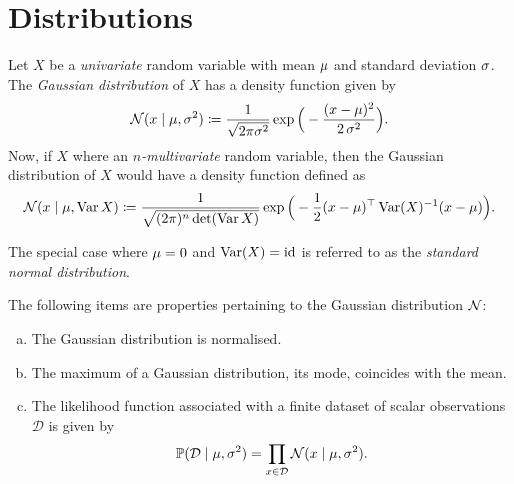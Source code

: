 \section{Distributions}

\begin{definition}
    \label{def:gaussian-distribution}
    Let \(X\) be a \emph{univariate} random variable with mean \(\mu\) and
    standard deviation \(\operatorname{\sigma}\). The \emph{Gaussian distribution} of \(X\) has a
    density function given by
    \[
        \operatorname{\mathcal{N}}(x \mid \mu, \operatorname{\sigma}^2) \coloneq \frac{1}{\sqrt{2 \pi \sigma^{2}}}
        \exp\Big( -\frac{(x - \mu)^2}{2 \operatorname{\sigma}^2} \Big).
    \]
    Now, if \(X\) where an \emph{\(n\)-multivariate} random variable, then the Gaussian
    distribution of \(X\) would have a density function defined as
    \[
        \operatorname{\mathcal{N}}(x \mid \mu, \operatorname{Var} X) \coloneq \frac{1}{\sqrt{(2 \pi)^n \det(\operatorname{Var} X)}}
        \exp\Big(-\frac{1}{2} (x - \mu)^{\operatorname{\top}} \operatorname{Var}(X)^{-1} (x - \mu)\Big).
    \]

    The special case where \(\mu = 0\) and \(\operatorname{Var}(X) = \operatorname{id}\) is referred to as the
    \emph{standard normal distribution}.
\end{definition}

\begin{proposition}
    \label{prop:gaussian-distribution-basic-properties}
    The following items are properties pertaining to the Gaussian distribution
    \(\operatorname{\mathcal{N}}\):
    \begin{enumerate}[(a)]\setlength\itemsep{0em}
        \item The Gaussian distribution is normalised.

        \item The maximum of a Gaussian distribution, its mode, coincides with the mean.

        \item The likelihood function associated with a finite dataset of scalar
              observations \(\mathcal{D}\) is given by
              \[
                  \operatorname{\mathbb{P}}(\mathcal{D} \mid \mu, \operatorname{\sigma}^2)
                  = \prod_{x \in \mathcal{D}} \operatorname{\mathcal{N}}(x \mid \mu, \operatorname{\sigma}^2).
              \]
    \end{enumerate}
\end{proposition}

